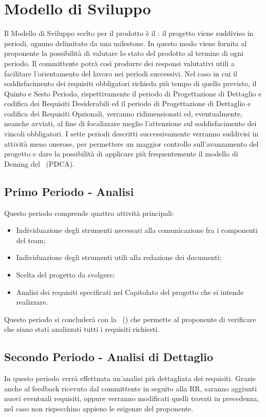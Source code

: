 \documentclass[../PianoDiProgetto.tex]{subfiles}
\begin{document}
\section{Modello di Sviluppo}
Il Modello di Sviluppo scelto per il prodotto è il : il progetto viene suddiviso in periodi, ognuno delimitato da una milestone. In questo modo viene fornita al proponente la possibilità di valutare lo stato del prodotto al termine di ogni periodo. Il committente potrà così produrre dei responsi valutativi utili a facilitare l'orientamento del lavoro nei periodi successivi. Nel caso in cui il soddisfacimento dei requisiti obbligatori richieda più tempo di quello previsto, il Quinto e Sesto Periodo, rispettivamente il periodo di Progettazione di Dettaglio e codifica dei Requisiti Desiderabili ed il periodo di Progettazione di Dettaglio e codifica dei Requisiti Opzionali, verranno ridimensionati ed, eventualmente, neanche avviati, al fine di focalizzare meglio l'attenzione sul soddisfacimento dei vincoli obbligatori. I sette periodi descritti successivamente verranno suddivisi in attività meno onerose, per permettere un maggior controllo sull’avanzamento del progetto e dare la possibilità di applicare più frequentemente il modello di Deming del \ (PDCA).

	\subsection{Primo Periodo - Analisi}
	Questo periodo comprende quattro attività principali:

	\begin{itemize}
		\item Individuazione degli strumenti necessari alla comunicazione fra i componenti del team;
		\item Individuazione degli strumenti utili alla redazione dei documenti;
		\item Scelta del progetto da svolgere;
		\item Analisi dei requisiti specificati nel Capitolato del progetto che si intende realizzare.
	\end{itemize}
			
	Questo periodo si concluderà con la \revisionedeirequisiti\ () che permette al proponente di verificare che siano stati analizzati tutti i requisiti richiesti.
			
	\subsection{Secondo Periodo - Analisi di Dettaglio}
	In questo periodo verrà effettuata un'analisi più dettagliata dei requisiti. Grazie anche al feedback ricevuto dal committente in seguito alla RR, saranno aggiunti nuovi eventuali requisiti, oppure verranno modificati quelli trovati in precedenza, nel caso non rispecchino appieno le esigenze del proponente.
		
\end{document}
